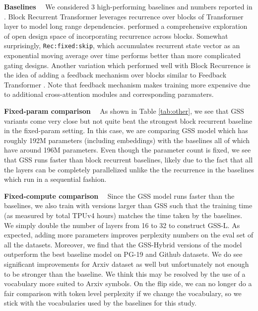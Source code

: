\textbf{Baselines} \ \ We considered 3 high-performing baselines and numbers reported in \citep{hutchins2022block}. Block Recurrent Transformer leverages recurrence over blocks of Transformer layer to model long range dependencies. \cite{hutchins2022block} performed a comprehensive exploration of open design space of incorporating recurrence across blocks. Somewhat surprisingly, \texttt{Rec:fixed:skip}, which accumulates recurrent state vector as an exponential moving average over time performs better than more complicated gating designs. Another variation which performed well with Block Recurrence is the idea of adding a feedback mechanism over blocks similar to Feedback Transformer \citep{feedback_fan2020addressing}. Note that feedback mechanism makes training more expensive due to additional cross-attention modules and corresponding paramaters.

\textbf{Fixed-param comparison} \ \ As shown in Table \ref{tab:other}, we see that GSS variants come very close but not quite beat the strongest block recurrent baseline in the fixed-param setting. In this case, we are comparing GSS model which has roughly 192M parameters (including embeddings) with the baselines all of which have around 196M parameters. Even though the parameter count is fixed, we see that GSS runs faster than block recurrent baselines, likely due to the fact that all the layers can be completely parallelized unlike the the recurrence in the baselines which run in a sequential fashion.

\textbf{Fixed-compute comparison} \ \ Since the GSS model runs faster than the baselines, we also train with versions larger than GSS such that the training time (as measured by total TPUv4 hours) matches the time taken by the baselines. We simply double the number of layers from 16 to 32 to construct GSS-L. As expected, adding more parameters improves perplexity numbers on the eval set of all the datasets. Moreover, we find that the GSS-Hybrid versions of the model outperform the best baseline model on PG-19 and Github datasets. We do see significant improvements for Arxiv dataset as well but unfortunately not enough to be stronger than the baseline. We think this may be resolved by the use of a vocabulary more suited to Arxiv symbols. On the flip side, we can no longer do a fair comparison with token level perplexity if we change the vocabulary, so we stick with the vocabularies used by the baselines for this study.

